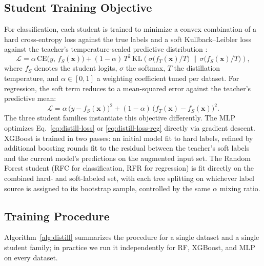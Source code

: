 \documentclass[10pt]{article}
\begin{document}
\subsection{Student Training Objective}
For classification, each student is trained to minimize a convex
combination of a hard cross-entropy loss against the true labels and
a soft Kullback--Leibler loss against the teacher's temperature-scaled
predictive distribution \citep{hinton2015distilling}:
\begin{equation}
\mathcal{L}
  = \alpha \, \mathrm{CE}\big(y,\, f_S(\mathbf{x})\big)
  + (1-\alpha)\, T^2 \, \mathrm{KL}\!\left(
       \sigma\!\big(f_T(\mathbf{x})/T\big) \,\|\,
       \sigma\!\big(f_S(\mathbf{x})/T\big)
    \right),
\label{eq:distill-loss}
\end{equation}
where $f_S$ denotes the student logits, $\sigma$ the softmax, $T$ the
distillation temperature, and $\alpha \in [0,1]$ a weighting
coefficient tuned per dataset. For regression, the soft term reduces
to a mean-squared error against the teacher's predictive mean:
\begin{equation}
\mathcal{L}
  = \alpha \,\big(y - f_S(\mathbf{x})\big)^2
  + (1-\alpha)\,\big(f_T(\mathbf{x}) - f_S(\mathbf{x})\big)^2.
\label{eq:distill-loss-reg}
\end{equation}
The three student families instantiate this objective differently.
The MLP optimizes Eq.~\eqref{eq:distill-loss} or
\eqref{eq:distill-loss-reg} directly via gradient descent. XGBoost is
trained in two passes: an initial model fit to hard labels, refined by
additional boosting rounds fit to the residual between the teacher's
soft labels and the current model's predictions on the augmented
input set. The Random Forest student (RFC for classification, RFR for
regression) is fit directly on the combined hard- and soft-labeled
set, with each tree splitting on whichever label source is assigned to
its bootstrap sample, controlled by the same $\alpha$ mixing ratio.

\subsection{Training Procedure}
Algorithm~\ref{alg:distill} summarizes the procedure for a single
dataset and a single student family; in practice we run it
independently for RF, XGBoost, and MLP on every dataset.
\end{document}
